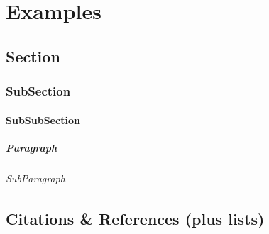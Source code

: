 \chapter{Examples}\label{chap:chap}

\section{Section}\label{sec:sec}
\subsection{SubSection}\label{subsec:subsec}
\subsubsection{SubSubSection}\label{subsubsec:subsubsec}
\paragraph{Paragraph}\label{par:par}
\subparagraph{SubParagraph}\label{subpar:subpar}


\section{Citations \& References (plus lists)}

